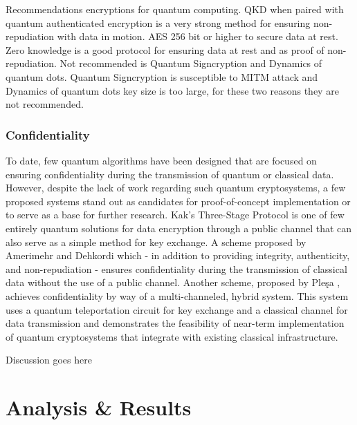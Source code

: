 \documentclass[sigconf]{acmart}
\begin{document}
Recommendations encryptions for quantum computing. QKD when paired with quantum authenticated encryption is a very strong method for ensuring non-repudiation with data in motion. AES 256 bit or higher to secure data at rest. Zero knowledge is a good protocol for ensuring data at rest and as proof of non-repudiation. Not recommended is Quantum Signcryption and Dynamics of quantum dots. Quantum Signcryption is susceptible to MITM attack and Dynamics of quantum dots key size is too large, for these two reasons they are not recommended.

\subsubsection{Confidentiality} %
To date, few quantum algorithms have been designed that are focused on ensuring confidentiality during the transmission of quantum or classical data. However, despite the lack of work regarding such quantum cryptosystems, a few proposed systems stand out as candidates for proof-of-concept implementation or to serve as a base for further research. Kak’s Three-Stage Protocol \cite{kak_three-stage_2006} is one of few entirely quantum solutions for data encryption through a public channel that can also serve as a simple method for key exchange. A scheme proposed by Amerimehr and Dehkordi \cite{amerimehr_quantum_2018} which - in addition to providing integrity, authenticity, and non-repudiation - ensures confidentiality during the transmission of classical data without the use of a public channel. Another scheme, proposed by Pleşa \cite{plesa_hybrid_2017}, achieves confidentiality by way of a multi-channeled, hybrid system. This system uses a quantum teleportation circuit for key exchange and a classical channel for data transmission and demonstrates the feasibility of near-term implementation of quantum cryptosystems that integrate with existing classical infrastructure.

Discussion goes here


\section{Analysis \& Results} %
\end{document}
